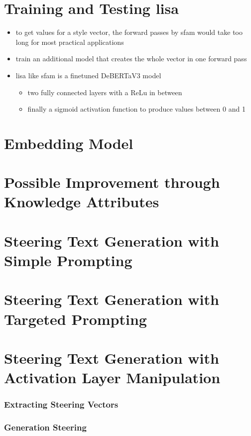 \section{Training and Testing \acs{lisa}}
\label{sec:approach:lisa}
\begin{itemize}
  \item to get values for a style vector, the \styleVectorSize{} forward passes by \ac{sfam} would take too long for most practical applications
  \item train an additional model that creates the whole vector in one forward pass
  \item \ac{lisa} like \ac{sfam} is a finetuned DeBERTaV3 model
        \begin{itemize}
          \item two fully connected layers with a ReLu in between %
          \item finally a sigmoid activation function to produce values between 0 and 1
        \end{itemize}
\end{itemize}

\section{Embedding Model}
\label{sec:approach:embedding}


\section{Possible Improvement through Knowledge Attributes}
\label{sec:approach:knowledge_attributes}


\section{Steering Text Generation with Simple Prompting}
\label{sec:approach:steering:simple}


\section{Steering Text Generation with Targeted Prompting}
\label{sec:approach:steering:targeted}


\section{Steering Text Generation with Activation Layer Manipulation}
\label{sec:approach:steering:actAdd}

\subsubsection{Extracting Steering Vectors}

\subsubsection{Generation Steering}